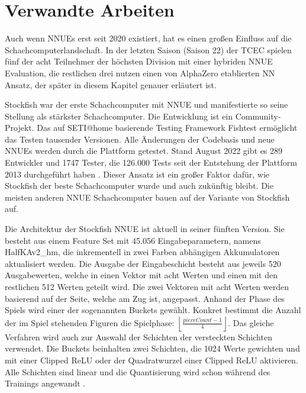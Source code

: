 \chapter{Verwandte Arbeiten}

Auch wenn \acp{NNUE} erst seit 2020 existiert, hat es einen großen Einfluss auf die Schachcomputerlandschaft. In der letzten Saison (Saison 22) der \ac{TCEC} \cite{TCEC22} spielen fünf der acht Teilnehmer der höchsten Division mit einer hybriden \ac{NNUE} Evaluation, die restlichen drei nutzen einen von AlphaZero etablierten \ac{NN} Ansatz, der später in diesem Kapitel genauer erläutert ist.


Stockfish war der erste Schachcomputer mit \ac{NNUE} und manifestierte so seine Stellung als stärkster Schachcomputer. Die Entwicklung ist ein Community-Projekt. Das auf SETI@home \cite{SETI2001} basierende Testing Framework Fishtest ermöglicht das Testen tausender Versionen. Alle Änderungen der Codebasis und neue \acp{NNUE} werden durch die Plattform getestet. Stand August 2022 gibt es 289 Entwickler und 1747 Tester, die 126.000 Tests seit der Entstehung der Plattform 2013 durchgeführt haben \cite{FishtestUsers}. Dieser Ansatz ist ein großer Faktor dafür, wie Stockfish der beste Schachcomputer wurde und auch zukünftig bleibt. Die meisten anderen \ac{NNUE} Schachcomputer bauen auf der Variante von Stockfish auf.
 
Die Architektur der Stockfish \ac{NNUE} ist aktuell in seiner fünften Version. Sie besteht aus einem Feature Set mit 45.056 Eingabeparametern, namens HalfKAv2\_hm, die inkrementell in zwei Farben abhängigen Akkumulatoren aktualisiert werden. Die Ausgabe der Eingabeschicht besteht aus jeweils 520 Ausgabewerten, welche in einen Vektor mit acht Werten und einen mit den restlichen 512 Werten geteilt wird. Die zwei Vektoren mit acht Werten werden basierend auf der Seite, welche am Zug ist, angepasst. Anhand der Phase des Spiels wird einer der sogenannten Buckets gewählt. Konkret bestimmt die Anzahl der im Spiel stehenden Figuren die Spielphase: $\left \lfloor\frac{pieceCount-1}{4}\right \rfloor$. Das gleiche Verfahren wird auch zur Auswahl der Schichten der versteckten Schichten verwendet. Die Buckets beinhalten zwei Schichten, die 1024 Werte gewichten und mit einer Clipped \ac{ReLU} oder der Quadratwurzel einer Clipped \ac{ReLU} aktivieren. Alle Schichten sind linear und die Quantisierung wird schon während des Trainings angewandt \cite{StockfishNNUE}.

